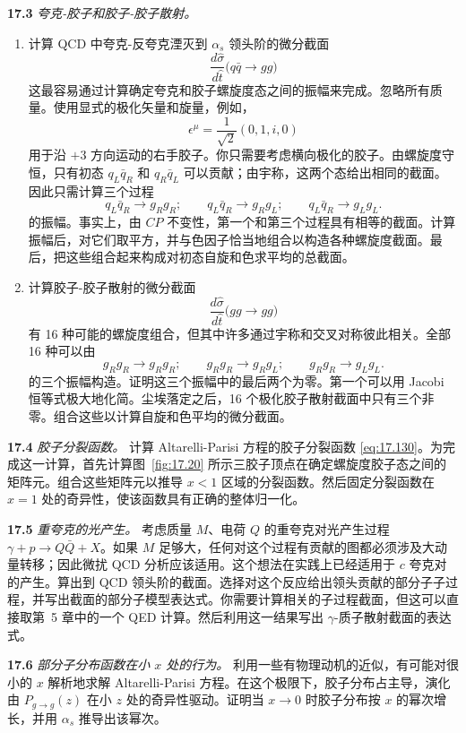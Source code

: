 \textbf{17.3} \emph{夸克-胶子和胶子-胶子散射。}
\begin{enumerate}[label=(\alph*)]
  \item 计算 QCD 中夸克-反夸克湮灭到 $\alpha_s$ 领头阶的微分截面
    \begin{equation}
      \frac{d\hat{\sigma}}{d\hat{t}}\bigl( q\bar{q} \to gg \bigr)
    \end{equation}
    这最容易通过计算确定夸克和胶子螺旋度态之间的振幅来完成。忽略所有质量。使用显式的极化矢量和旋量，例如，
    \begin{equation}
      \epsilon^\mu = \frac{1}{\sqrt{2}}(0, 1, i, 0)
    \end{equation}
    用于沿 $+3$ 方向运动的右手胶子。你只需要考虑横向极化的胶子。由螺旋度守恒，只有初态 $q_L\bar{q}_R$ 和 $q_R\bar{q}_L$ 可以贡献；由宇称，这两个态给出相同的截面。因此只需计算三个过程
    \begin{equation}
      q_L\bar{q}_R \to g_Rg_R;\qquad
      q_L\bar{q}_R \to g_Rg_L;\qquad
      q_L\bar{q}_R \to g_Lg_L .
    \end{equation}
    的振幅。事实上，由 $CP$ 不变性，第一个和第三个过程具有相等的截面。计算振幅后，对它们取平方，并与色因子恰当地组合以构造各种螺旋度截面。最后，把这些组合起来构成对初态自旋和色求平均的总截面。
  \item 计算胶子-胶子散射的微分截面
    \begin{equation}
      \frac{d\hat{\sigma}}{d\hat{t}}\bigl( gg \to gg \bigr)
    \end{equation}
    有 16 种可能的螺旋度组合，但其中许多通过宇称和交叉对称彼此相关。全部 16 种可以由
    \begin{equation}
      g_Rg_R \to g_Rg_R;\qquad
      g_Rg_R \to g_Rg_L;\qquad
      g_Rg_R \to g_Lg_L .
    \end{equation}
    的三个振幅构造。证明这三个振幅中的最后两个为零。第一个可以用 Jacobi 恒等式极大地化简。尘埃落定之后，16 个极化胶子散射截面中只有三个非零。组合这些以计算自旋和色平均的微分截面。
\end{enumerate}

\textbf{17.4} \emph{胶子分裂函数。} 计算 Altarelli-Parisi 方程的胶子分裂函数 \eqref{eq:17.130}。为完成这一计算，首先计算图~\ref{fig:17.20} 所示三胶子顶点在确定螺旋度胶子态之间的矩阵元。组合这些矩阵元以推导 $x < 1$ 区域的分裂函数。然后固定分裂函数在 $x = 1$ 处的奇异性，使该函数具有正确的整体归一化。

\textbf{17.5} \emph{重夸克的光产生。} 考虑质量 $M$、电荷 $Q$ 的重夸克对光产生过程 $\gamma + p \to Q\bar{Q} + X$。如果 $M$ 足够大，任何对这个过程有贡献的图都必须涉及大动量转移；因此微扰 QCD 分析应该适用。这个想法在实践上已经适用于 $c$ 夸克对的产生。算出到 QCD 领头阶的截面。选择对这个反应给出领头贡献的部分子子过程，并写出截面的部分子模型表达式。你需要计算相关的子过程截面，但这可以直接取第~5 章中的一个 QED 计算。然后利用这一结果写出 $\gamma$-质子散射截面的表达式。

\textbf{17.6} \emph{部分子分布函数在小 $x$ 处的行为。} 利用一些有物理动机的近似，有可能对很小的 $x$ 解析地求解 Altarelli-Parisi 方程。在这个极限下，胶子分布占主导，演化由 $P_{g\to g}(z)$ 在小 $z$ 处的奇异性驱动。证明当 $x\to 0$ 时胶子分布按 $x$ 的幂次增长，并用 $\alpha_s$ 推导出该幂次。
